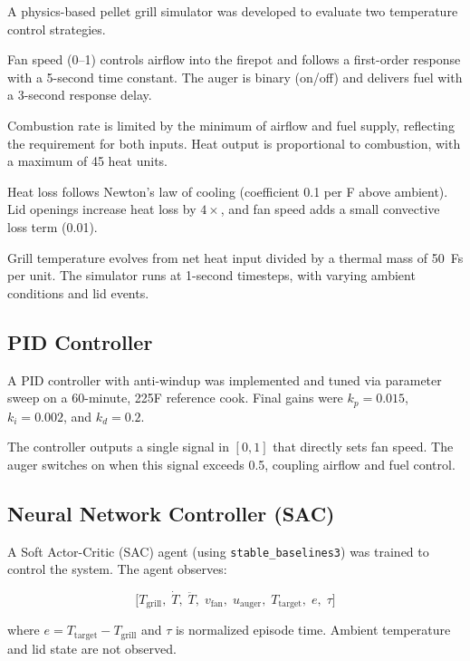 \documentclass{article}
\begin{document}
A physics-based pellet grill simulator was developed to evaluate two
temperature control strategies.

Fan speed (0--1) controls airflow into the firepot and follows a
first-order response with a 5-second time constant. The auger is binary
(on/off) and delivers fuel with a 3-second response delay.

Combustion rate is limited by the minimum of airflow and fuel supply,
reflecting the requirement for both inputs. Heat output is proportional
to combustion, with a maximum of 45 heat units.

Heat loss follows Newton's law of cooling (coefficient 0.1 per
\textdegree F above ambient). Lid openings increase heat loss by $4\times$,
and fan speed adds a small convective loss term (0.01).

Grill temperature evolves from net heat input divided by a thermal mass
of 50~\textdegree F{\textperiodcentered}s per unit. The simulator runs at
1-second timesteps, with varying ambient conditions and lid events.

\subsection{PID Controller}

A PID controller with anti-windup was implemented and tuned via parameter
sweep on a 60-minute, 225\textdegree F reference cook. Final gains were
$k_p = 0.015$, $k_i = 0.002$, and $k_d = 0.2$.

The controller outputs a single signal in $[0,1]$ that directly sets fan
speed. The auger switches on when this signal exceeds 0.5, coupling airflow
and fuel control.

\subsection{Neural Network Controller (SAC)}

A Soft Actor-Critic (SAC) agent (using \texttt{stable\_baselines3}) was
trained to control the system. The agent observes:

\begin{equation*}
    \bigl[T_{\text{grill}},\;\dot{T},\;\ddot{T},\;
    v_{\text{fan}},\;u_{\text{auger}},\;
    T_{\text{target}},\;e,\;\tau\bigr]
\end{equation*}

where $e = T_{\text{target}} - T_{\text{grill}}$ and $\tau$ is normalized
episode time. Ambient temperature and lid state are not observed.
\end{document}
